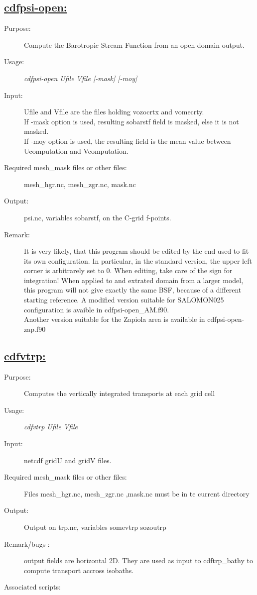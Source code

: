 \documentclass[a4paper,11pt]{article}
\begin{document}
\subsection*{\underline{cdfpsi-open:}}
\begin{description}
\item[Purpose:] Compute the Barotropic Stream Function from an open domain output.
\item[Usage:] {\em cdfpsi-open  Ufile Vfile [-mask] [-moy] }
\item[Input:] Ufile and Vfile are the files holding vozocrtx and vomecrty.\\
   If -mask option is used, resulting sobarstf field is masked, else it is not masked. \\
   If -moy option is used, the resulting field is the mean value between Ucomputation and Vcomputation.
\item[Required mesh\_mask files or other files:]   mesh\_hgr.nc, mesh\_zgr.nc, mask.nc  \\
\item[Output:]psi.nc, variables sobarstf, on the C-grid f-points.
\item[Remark:]  It is very likely, that this program should be edited by the end used to fit its own configuration. In particular, in the standard
       version, the upper left corner is arbitrarely set to 0. When editing, take care of the sign for integration! When applied to and extrated
       domain from a larger model, this program will not give exactly the same BSF, because of a different starting reference.
      A modified version suitable for SALOMON025 configuration is avaible in cdfpsi-open\_AM.f90. \\
      Another version suitable for the Zapiola area is available in cdfpsi-open-zap.f90
\end{description}

\newpage
\subsection*{\underline{cdfvtrp:}}
\begin{description}
\item[Purpose:]  Computes the vertically integrated transports at each grid cell
\item[Usage:] {\em cdfvtrp  Ufile Vfile  }
\item[Input:] netcdf gridU and gridV files.
\item[Required mesh\_mask files or other files:]    Files mesh\_hgr.nc, mesh\_zgr.nc ,mask.nc must be in te current directory
\item[Output:] Output on trp.nc, variables somevtrp sozoutrp
\item[Remark/bugs :] output fields are horizontal 2D. They are used as input to cdftrp\_bathy to compute transport accross isobaths.
\item[Associated scripts:]
\end{description}
\end{document}
